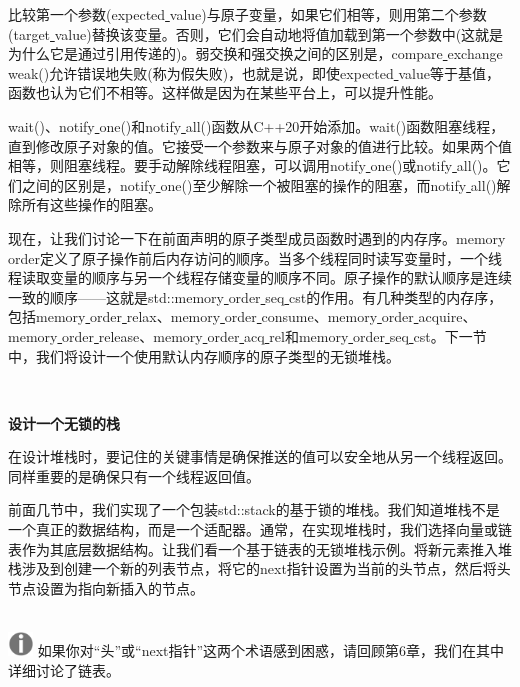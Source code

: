 比较第一个参数(expected\underline{ }value)与原子变量，如果它们相等，则用第二个参数(target\underline{ }value)替换该变量。否则，它们会自动地将值加载到第一个参数中(这就是为什么它是通过引用传递的)。弱交换和强交换之间的区别是，compare\underline{ }exchange\underline{ }weak()允许错误地失败(称为假失败)，也就是说，即使expected\underline{ }value等于基值，函数也认为它们不相等。这样做是因为在某些平台上，可以提升性能。 \par
wait()、notify\underline{ }one()和notify\underline{ }all()函数从C++20开始添加。wait()函数阻塞线程，直到修改原子对象的值。它接受一个参数来与原子对象的值进行比较。如果两个值相等，则阻塞线程。要手动解除线程阻塞，可以调用notify\underline{ }one()或notify\underline{ }all()。它们之间的区别是，notify\underline{ }one()至少解除一个被阻塞的操作的阻塞，而notify\underline{ }all()解除所有这些操作的阻塞。 \par
现在，让我们讨论一下在前面声明的原子类型成员函数时遇到的内存序。memory\underline{ }order定义了原子操作前后内存访问的顺序。当多个线程同时读写变量时，一个线程读取变量的顺序与另一个线程存储变量的顺序不同。原子操作的默认顺序是连续一致的顺序——这就是std::memory\underline{ }order\underline{ }seq\underline{ }cst的作用。有几种类型的内存序，包括memory\underline{ }order\underline{ }relax、memory\underline{ }order\underline{ }consume、memory\underline{ }order\underline{ }acquire、memory\underline{ }order\underline{ }release、memory\underline{ }order\underline{ }acq\underline{ }rel和memory\underline{ }order\underline{ }seq\underline{ }cst。下一节中，我们将设计一个使用默认内存顺序的原子类型的无锁堆栈。 \par

\noindent\textbf{}\ \par
\textbf{设计一个无锁的栈} \ \par
在设计堆栈时，要记住的关键事情是确保推送的值可以安全地从另一个线程返回。同样重要的是确保只有一个线程返回值。 \par
前面几节中，我们实现了一个包装std::stack的基于锁的堆栈。我们知道堆栈不是一个真正的数据结构，而是一个适配器。通常，在实现堆栈时，我们选择向量或链表作为其底层数据结构。让我们看一个基于链表的无锁堆栈示例。将新元素推入堆栈涉及到创建一个新的列表节点，将它的next指针设置为当前的头节点，然后将头节点设置为指向新插入的节点。 \par

\hspace*{\fill} \\ %
\includegraphics[width=0.05\textwidth]{images/warn}
如果你对“头”或“next指针”这两个术语感到困惑，请回顾第6章，我们在其中详细讨论了链表。 \par
\noindent\textbf{}\ \par

